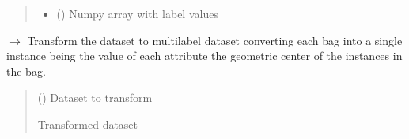 \documentclass[letterpaper,10pt,english]{sphinxmanual}
\begin{document}
\begin{fulllineitems}
\begin{fulllineitems}
\begin{quote}
\begin{description}
\begin{itemize}
\item {} 
\sphinxAtStartPar
{} () \textendash{} Numpy array with label values

\end{itemize}


\end{description}\end{quote}

\end{fulllineitems}


\begin{fulllineitems}
\label{\detokenize{transformation/mimlTOml/_autosummary/miml.transformation.mimlTOml.geometric.GeometricTransformation:miml.transformation.mimlTOml.geometric.GeometricTransformation.transform_dataset}}
\pysigstartsignatures
\pysiglinewithargsret
{}
{}
{{ $\rightarrow$ {\hyperref[\detokenize{data/_autosummary/miml.data.miml_dataset.MIMLDataset:miml.data.miml_dataset.MIMLDataset}]{}}}}
\pysigstopsignatures
\sphinxAtStartPar
Transform the dataset to multilabel dataset converting each bag into a single instance being the value of each
attribute the geometric center of the instances in the bag.
\begin{quote}\begin{description}
\sphinxAtStartPar
{} ({\hyperref[\detokenize{data/_autosummary/miml.data.miml_dataset.MIMLDataset:miml.data.miml_dataset.MIMLDataset}]{}}) \textendash{} Dataset to transform

\sphinxAtStartPar
{} \textendash{} Transformed dataset

\sphinxAtStartPar
{\hyperref[\detokenize{data/_autosummary/miml.data.miml_dataset.MIMLDataset:miml.data.miml_dataset.MIMLDataset}]{}}

\end{description}\end{quote}

\end{fulllineitems}


\end{fulllineitems}
\end{document}
